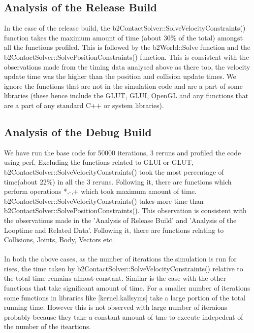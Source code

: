 \documentclass[11pt]{article}
\begin{document}
\subsection{Analysis of the Release Build}
 In the case of the release build, the b2ContactSolver::SolveVelocityConstraints() function takes the maximum amount of time (about 30\% of the total) amongst all the functions profiled. This is followed by the b2World::Solve function and the b2ContactSolver::SolvePositionConstraints() function. This is consistent with the observations made from the timing data analysed above as there too, the velocity update time was the higher than the position and collision update times. We ignore the functions that are not in the simulation code and are a part of some libraries (these hence include the GLUT, GLUI, OpenGL and any functions that are a part of any standard C++ or system libraries).

\subsection{Analysis of the Debug Build}
We have run the base code for 50000 iterations, 3 reruns and profiled the code using perf.
Excluding the functions related to GLUI or GLUT, b2ContactSolver::SolveVelocityConstraints() took the most percentage of time(about 22\%) in all the 3 reruns. Following it, there are functions which perform operations *,-,+ which took  maximum amount of time. b2ContactSolver::SolveVelocityConstraints() takes more time than b2ContactSolver::SolvePositionConstraints(). This observation is consistent with the observations made in the 'Analysis of Release Build' and 'Analysis of the Looptime and Related Data'. Following it, there are functions relating to Collisions, Joints, Body, Vectors etc.
\\
\\
\indent In both the above cases, as the number of iterations the simulation is run for rises, the time taken by b2ContactSolver::SolveVelocityConstraints() relative to the total time remains almost constant. Similar is the case with the other functions that take significant amount of time. For a smaller number of iterations some functions in  libraries like [kernel.kallsyms] take a large portion of the total running time. However this is not observed with large number of iteraions probably because they take a constant amount of tme to execute indepedent of the number of the iteartions.
\end{document}
